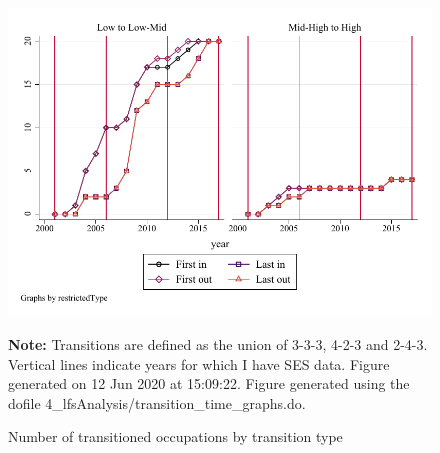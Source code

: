 \begin{figure}[!h]
\caption{Number of transitioned occupations by transition type}
\includegraphics[width=\textwidth]{../output/transition_timeline}
\par \begin{minipage}[h]{\textwidth}{\scriptsize\textbf{Note:} Transitions are defined as the union of 3-3-3, 4-2-3 and 2-4-3. Vertical lines indicate years for which I have SES data. Figure generated on 12 Jun 2020 at 15:09:22. Figure generated using the dofile 4\_lfsAnalysis/transition\_time\_graphs.do.}\end{minipage}
\end{figure}
